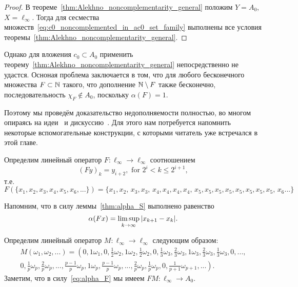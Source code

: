 \begin{proof}
	В теореме~\ref{thm:Alekhno_noncomplementarity_general}
	положим $Y=A_0$, $X=\ell_\infty$.
	Тогда для сесмества множеств~\eqref{eq:c0_noncomplemented_in_ac0_set_family}
	выполнены все условия теоремы~\ref{thm:Alekhno_noncomplementarity_general}.
\end{proof}

Однако для вложения $c_0 \subset A_0$ применить теорему~\ref{thm:Alekhno_noncomplementarity_general}
непосредственно не удастся.
Осноная проблема заключается в том, что для любого бесконечного множества $F \subset \mathbb{N}$ такого, что
дополнение $\mathbb{N} \setminus F$ также бесконечно, последовательность $\chi_F \notin A_0$,
поскольку $\alpha(F) = 1$.

Поэтому мы проведём доказательство недополняемости полностью,
во многом опираясь на идеи~\cite{whitley1968projecting} и дискуссию~\cite{mathSE_Phillips}.
Для этого нам потребуется напомнить некоторые вспомогательные конструкции,
с которыми читатель уже встречался в этой главе.


Определим линейный оператор  $F:\ell_\infty \to \ell_\infty$ соотношением
\begin{equation}
	\label{operator_F}
	(Fy)_k = y_{i+2}, \mbox{ for } 2^i < k \leq 2^{i+1}
	,
\end{equation}
т.е.
\begin{equation}
	F(\{x_1,x_2,x_3,x_4,x_5,x_6, ...\}) = \{x_1,x_2,\,x_3,x_3,\,x_4,x_4,x_4,x_4,\,x_5,x_5,x_5,x_5,x_5,x_5,x_5,x_5,\,x_6...\}
\end{equation}

Напомним, что в силу леммы~\ref{thm:alpha_S} выполнено равенство
\begin{equation}
	\label{eq:alpha_F}
	\alpha(Fx) = \varlimsup_{k\to\infty} |x_{k+1} - x_{k}|
	.
\end{equation}


Определим линейный оператор $M:\ell_\infty \to \ell_\infty$ следующим образом:
\begin{multline*}
	M(\omega_1,\omega_2,...)=\left(
		0, 1\omega_1,
		0, \frac{1}{2}\omega_2, 1\omega_2, \frac{1}{2}\omega_2,
		0, \frac{1}{3}\omega_3, \frac{2}{3}\omega_3, 1\omega_3, \frac{2}{3}\omega_3, \frac{1}{3}\omega_3,
		0, ...,
	\right. \\ \left.
		0, \frac{1}{p}\omega_p, \frac{2}{p}\omega_p, ..., \frac{p-1}{p}\omega_p, 1\omega_p,
			\frac{p-1}{p}\omega_p, ..., \frac{2}{p}\omega_p, \frac{1}{p}\omega_p,
		0, \frac{1}{p+1}\omega_{p+1}, ...
	\right)
	.
\end{multline*}
Заметим, что в силу~\eqref{eq:alpha_F} мы имеем $FM: \ell_\infty \to A_0$.


